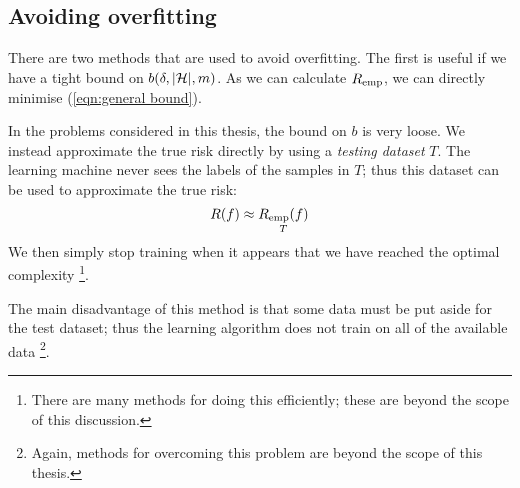 \subsection{Avoiding overfitting}

There are two methods that are used to avoid overfitting.  The first
is useful if we have a tight bound on $b(\delta, |\mathcal{H}|, m)$.  As we
can calculate $R_{\mathrm{emp}}$, we can directly minimise (\ref{eqn:general
bound}).

In the problems considered in this thesis, the bound on $b$ is very
loose.  We instead approximate the true risk directly by using a
\emph{testing dataset} $T$.  The learning machine never sees the
labels of the samples in $T$; thus this dataset can be used to
approximate the true risk:
%
\begin{equation}
R(f) \approx \underset{T}{R_{\mathrm{emp}}(f)}
\end{equation}
%
We then simply stop training when it appears that we have reached the
optimal complexity%
\footnote{There are many methods for doing this efficiently;
these are beyond the scope of this discussion.}.

The main disadvantage of this method is that some data must be put
aside for the test dataset; thus the learning algorithm does not train
on all of the available data%
\footnote{Again, methods for overcoming this problem are beyond the
scope of this thesis.}.
